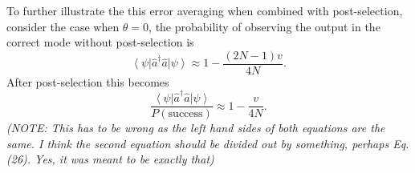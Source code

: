 \documentclass[aps,pra,twocolumn,superscriptaddress,numerical,floatfix]{revtex4-1}
\begin{document}
To further illustrate the this error averaging when combined with post-selection, consider the case when $\theta=0$, the probability of observing the output in the correct mode without post-selection is
\begin{equation}
	\left\langle \psi\right|\hat{a}^{\dagger}\hat{a}\left|\psi\right\rangle \approx 1 - \frac{(2N-1)v}{4N}. \label{eq:1pNoPost}
\end{equation}
After post-selection this becomes
\begin{equation}
	\frac{\left\langle \psi\right|\hat{a}^{\dagger}\hat{a}\left|\psi\right\rangle}{P(\textrm{success})} \approx 1 - \frac{v}{4N}. \label{eq:1pWithPost}
\end{equation}
\emph{(NOTE: This has to be wrong as the left hand sides of both equations are the same.  I think the second equation should be divided out by something, perhaps Eq. (26). Yes, it was meant to be exactly that)}
		
\end{document}
